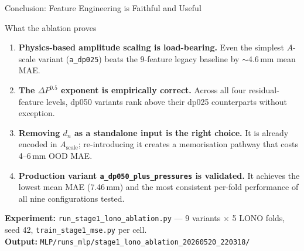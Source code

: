 \documentclass[UTF8,aspectratio=169]{ctexbeamer}
\begin{document}
\begin{frame}{Conclusion: Feature Engineering is Faithful and Useful}
\small
\begin{block}{What the ablation proves}
\begin{enumerate}
  \item \textbf{Physics-based amplitude scaling is load-bearing.}
        Even the simplest $A$-scale variant (\texttt{a\_dp025}) beats the 9-feature legacy
        baseline by $\sim$4.6\,mm mean MAE.
  \item \textbf{The $\Delta P^{0.5}$ exponent is empirically correct.}
        Across all four residual-feature levels, dp050 variants rank above their dp025
        counterparts without exception.
  \item \textbf{Removing $d_n$ as a standalone input is the right choice.}
        It is already encoded in $A_{\mathrm{scale}}$; re-introducing it creates a memorisation
        pathway that costs 4--6\,mm OOD MAE.
  \item \textbf{Production variant \texttt{a\_dp050\_plus\_pressures} is validated.}
        It achieves the lowest mean MAE (7.46\,mm) and the most consistent per-fold
        performance of all nine configurations tested.
\end{enumerate}
\end{block}

\vspace{0.3em}
\textbf{Experiment:} \texttt{run\_stage1\_lono\_ablation.py} --- 9 variants $\times$ 5 LONO
folds, seed 42, \texttt{train\_stage1\_mse.py} per cell.\\
\textbf{Output:} \texttt{MLP/runs\_mlp/stage1\_lono\_ablation\_20260520\_220318/}
\end{frame}
\end{document}
